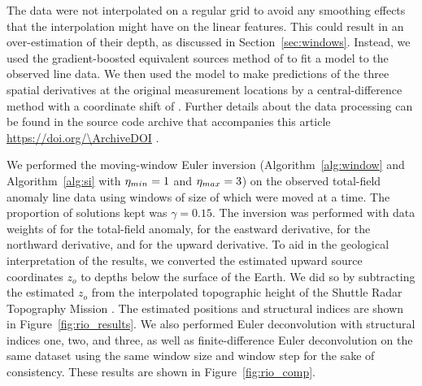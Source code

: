 The data were not interpolated on a regular grid to avoid any smoothing effects
that the interpolation might have on the linear features. This could result in
an over-estimation of their depth, as discussed in Section~\ref{sec:windows}.
Instead, we used the gradient-boosted equivalent sources method of
\citet{Soler2021} to fit a model to the observed line data.
We then used the model to make predictions of the three spatial derivatives at
the original measurement locations by a central-difference method with
a coordinate shift of \RioDerivSpacing{}. Further details about the data
processing can be found in the source code archive that accompanies this
article \url{https://doi.org/\ArchiveDOI} \citep{figshare}.

We performed the moving-window Euler inversion (Algorithm~\ref{alg:window} and
Algorithm~\ref{alg:si} with $\eta_{min}=1$ and
$\eta_{max}=3$) on the observed total-field anomaly line data using
windows of size of \RioWindowSize{} which were moved \RioWindowStep{} at
a time.
The proportion of solutions kept was $\gamma=0.15$.
The inversion was performed with data weights of \RioWeightsF{} for the
total-field anomaly, \RioWeightsE{} for the eastward derivative, \RioWeightsN{}
for the northward derivative, and \RioWeightsU{} for the upward derivative.
To aid in the geological interpretation of the results, we converted the
estimated upward source coordinates $z_o$ to depths below the surface of the
Earth. We did so by subtracting the estimated $z_o$ from the interpolated
topographic height of the Shuttle Radar Topography Mission
\citep[SRTM;][]{SRTM}. The estimated positions and structural indices are shown
in Figure~\ref{fig:rio_results}.
We also performed Euler deconvolution with structural indices one, two, and
three, as well as finite-difference Euler deconvolution on the same dataset
using the same window size and window step for the sake of consistency.
These results are shown in Figure~\ref{fig:rio_comp}.

